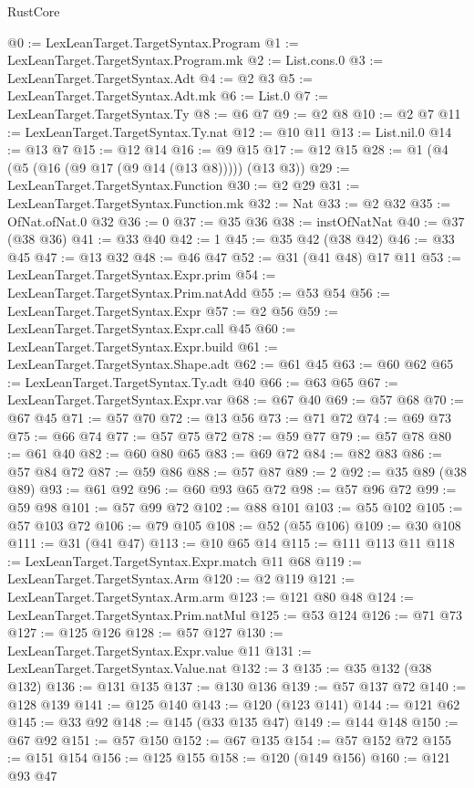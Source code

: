\begin{lexlean}{RustCore}
\begin{coremodule}
{\begin{coremodule}
{{{{{{@0 := LexLeanTarget.TargetSyntax.Program
@1 := LexLeanTarget.TargetSyntax.Program.mk
@2 := List.cons.{0}
@3 := LexLeanTarget.TargetSyntax.Adt
@4 := @2 @3
@5 := LexLeanTarget.TargetSyntax.Adt.mk
@6 := List.{0}
@7 := LexLeanTarget.TargetSyntax.Ty
@8 := @6 @7
@9 := @2 @8
@10 := @2 @7
@11 := LexLeanTarget.TargetSyntax.Ty.nat
@12 := @10 @11
@13 := List.nil.{0}
@14 := @13 @7
@15 := @12 @14
@16 := @9 @15
@17 := @12 @15
@28 := @1 (@4 (@5 (@16 (@9 @17 (@9 @14 (@13 @8))))) (@13 @3))
@29 := LexLeanTarget.TargetSyntax.Function
@30 := @2 @29
@31 := LexLeanTarget.TargetSyntax.Function.mk
@32 := Nat
@33 := @2 @32
@35 := OfNat.ofNat.{0} @32
@36 := 0
@37 := @35 @36
@38 := instOfNatNat
@40 := @37 (@38 @36)
@41 := @33 @40
@42 := 1
@45 := @35 @42 (@38 @42)
@46 := @33 @45
@47 := @13 @32
@48 := @46 @47
@52 := @31 (@41 @48) @17 @11
@53 := LexLeanTarget.TargetSyntax.Expr.prim
@54 := LexLeanTarget.TargetSyntax.Prim.natAdd
@55 := @53 @54
@56 := LexLeanTarget.TargetSyntax.Expr
@57 := @2 @56
@59 := LexLeanTarget.TargetSyntax.Expr.call @45
@60 := LexLeanTarget.TargetSyntax.Expr.build
@61 := LexLeanTarget.TargetSyntax.Shape.adt
@62 := @61 @45
@63 := @60 @62
@65 := LexLeanTarget.TargetSyntax.Ty.adt @40
@66 := @63 @65
@67 := LexLeanTarget.TargetSyntax.Expr.var
@68 := @67 @40
@69 := @57 @68
@70 := @67 @45
@71 := @57 @70
@72 := @13 @56
@73 := @71 @72
@74 := @69 @73
@75 := @66 @74
@77 := @57 @75 @72
@78 := @59 @77
@79 := @57 @78
@80 := @61 @40
@82 := @60 @80 @65
@83 := @69 @72
@84 := @82 @83
@86 := @57 @84 @72
@87 := @59 @86
@88 := @57 @87
@89 := 2
@92 := @35 @89 (@38 @89)
@93 := @61 @92
@96 := @60 @93 @65 @72
@98 := @57 @96 @72
@99 := @59 @98
@101 := @57 @99 @72
@102 := @88 @101
@103 := @55 @102
@105 := @57 @103 @72
@106 := @79 @105
@108 := @52 (@55 @106)
@109 := @30 @108
@111 := @31 (@41 @47)
@113 := @10 @65 @14
@115 := @111 @113 @11
@118 := LexLeanTarget.TargetSyntax.Expr.match @11 @68
@119 := LexLeanTarget.TargetSyntax.Arm
@120 := @2 @119
@121 := LexLeanTarget.TargetSyntax.Arm.arm
@123 := @121 @80 @48
@124 := LexLeanTarget.TargetSyntax.Prim.natMul
@125 := @53 @124
@126 := @71 @73
@127 := @125 @126
@128 := @57 @127
@130 := LexLeanTarget.TargetSyntax.Expr.value @11
@131 := LexLeanTarget.TargetSyntax.Value.nat
@132 := 3
@135 := @35 @132 (@38 @132)
@136 := @131 @135
@137 := @130 @136
@139 := @57 @137 @72
@140 := @128 @139
@141 := @125 @140
@143 := @120 (@123 @141)
@144 := @121 @62
@145 := @33 @92
@148 := @145 (@33 @135 @47)
@149 := @144 @148
@150 := @67 @92
@151 := @57 @150
@152 := @67 @135
@154 := @57 @152 @72
@155 := @151 @154
@156 := @125 @155
@158 := @120 (@149 @156)
@160 := @121 @93 @47
}}}}}}
\end{coremodule}}
\end{coremodule}
\end{lexlean}
